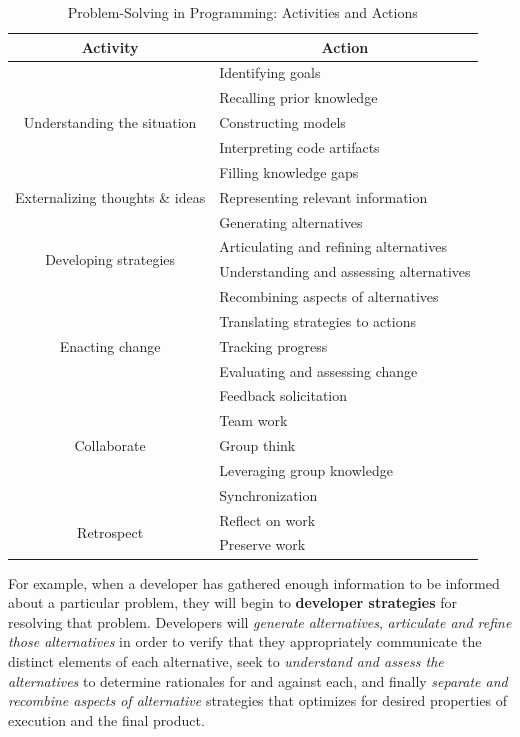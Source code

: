 \documentclass{ppig}
\begin{document}
\begin{table}[!htbp]
\caption{Problem-Solving in Programming: Activities and Actions}
\label{matrix}
\centering
\begin{tabular}{|c|l|}
	\hline
	\multicolumn{1}{|c|}{\textbf{Activity}} 
	& \multicolumn{1}{c|}{\textbf{Action}}\\\hline
	\multirow{5}{*}{Understanding the situation} 
	& Identifying goals \\\cline{2-2}
	& Recalling prior knowledge \\\cline{2-2}
	& Constructing models \\\cline{2-2}
	& Interpreting code artifacts \\\cline{2-2}
	& Filling knowledge gaps \\\hline
	Externalizing thoughts \& ideas 
	& Representing relevant information \\\hline
	\multirow{4}{*}{Developing strategies} 
	& Generating alternatives \\\cline{2-2}
	& Articulating and refining alternatives \\\cline{2-2}
	& Understanding and assessing alternatives \\\cline{2-2}
	& Recombining aspects of alternatives \\\hline
	\multirow{3}{*}{Enacting change} 
	& Translating strategies to actions \\\cline{2-2}
	& Tracking progress \\\cline{2-2}
	& Evaluating and assessing change \\\hline
	\multirow{5}{*}{Collaborate} 
	& Feedback solicitation \\\cline{2-2}
	& Team work \\\cline{2-2}
	& Group think \\\cline{2-2}
	& Leveraging group knowledge \\\cline{2-2}
	& Synchronization \\\hline
	\multirow{2}{*}{Retrospect} 
	& Reflect on work \\\cline{2-2}
	& Preserve work \\\hline
\end{tabular}
\end{table}

For example, when a developer has gathered enough information to be informed about a particular problem, they will begin to \textbf{developer strategies} for resolving that problem.
Developers will \textit{generate alternatives}, \textit{articulate and refine those alternatives} in order to verify that they appropriately communicate the distinct elements of each alternative, seek to \textit{understand and assess the alternatives} to determine rationales for and against each, and finally \textit{separate and recombine aspects of alternative} strategies that optimizes for desired properties of execution and the final product.
\end{document}

